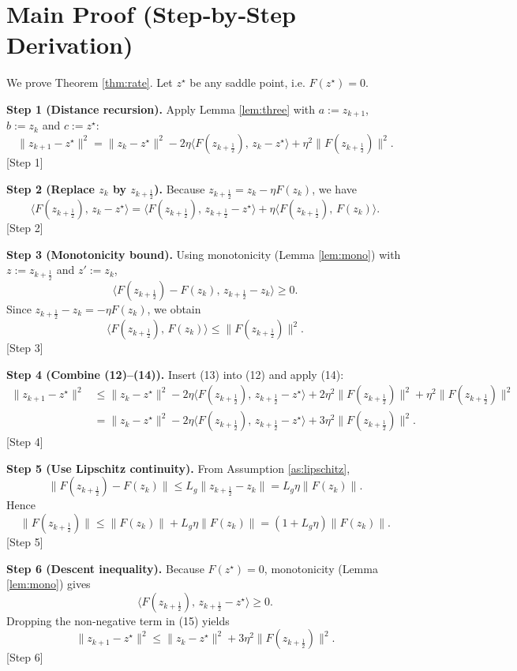 \documentclass{article}
\begin{document}
\section*{Main Proof (Step‑by‑Step Derivation)}
We prove Theorem \ref{thm:rate}. Let $z^{\star}$ be any saddle point, i.e. $F(z^{\star})=0$.

\bigskip
\noindent\textbf{Step 1 (Distance recursion).}  
Apply Lemma \ref{lem:three} with $a:=z_{k+1}$, $b:=z_{k}$ and $c:=z^{\star}$:
\[
\|z_{k+1}-z^{\star}\|^{2}= \|z_{k}-z^{\star}\|^{2}
-2\eta\langle F(z_{k+\frac12}),\,z_{k}-z^{\star}\rangle
+\eta^{2}\|F(z_{k+\frac12})\|^{2}.
\tag{12}
\]
[Step 1]

\noindent\textbf{Step 2 (Replace $z_{k}$ by $z_{k+\frac12}$).}  
Because $z_{k+\frac12}=z_{k}-\eta F(z_{k})$, we have
\[
\langle F(z_{k+\frac12}),\,z_{k}-z^{\star}\rangle
= \langle F(z_{k+\frac12}),\,z_{k+\frac12}-z^{\star}\rangle
+\eta\langle F(z_{k+\frac12}),\,F(z_{k})\rangle .
\tag{13}
\]
[Step 2]

\noindent\textbf{Step 3 (Monotonicity bound).}  
Using monotonicity (Lemma \ref{lem:mono}) with $z:=z_{k+\frac12}$ and $z':=z_{k}$,
\[
\langle F(z_{k+\frac12})-F(z_{k}),\,z_{k+\frac12}-z_{k}\rangle\ge0.
\]
Since $z_{k+\frac12}-z_{k}=-\eta F(z_{k})$, we obtain
\[
\langle F(z_{k+\frac12}),\,F(z_{k})\rangle
\le\|F(z_{k+\frac12})\|^{2}.
\tag{14}
\]
[Step 3]

\noindent\textbf{Step 4 (Combine (12)–(14)).}  
Insert (13) into (12) and apply (14):
\[
\begin{aligned}
\|z_{k+1}-z^{\star}\|^{2}
&\le \|z_{k}-z^{\star}\|^{2}
-2\eta\langle F(z_{k+\frac12}),\,z_{k+\frac12}-z^{\star}\rangle
+2\eta^{2}\|F(z_{k+\frac12})\|^{2}
+\eta^{2}\|F(z_{k+\frac12})\|^{2}\\[1mm]
&= \|z_{k}-z^{\star}\|^{2}
-2\eta\langle F(z_{k+\frac12}),\,z_{k+\frac12}-z^{\star}\rangle
+3\eta^{2}\|F(z_{k+\frac12})\|^{2}.
\end{aligned}
\tag{15}
\]
[Step 4]

\noindent\textbf{Step 5 (Use Lipschitz continuity).}  
From Assumption \ref{as:lipschitz},
\[
\|F(z_{k+\frac12})-F(z_{k})\|\le L_{g}\|z_{k+\frac12}-z_{k}\|
= L_{g}\eta\|F(z_{k})\|.
\]
Hence
\[
\|F(z_{k+\frac12})\|\le\|F(z_{k})\|+L_{g}\eta\|F(z_{k})\|
=(1+L_{g}\eta)\|F(z_{k})\|.
\tag{16}
\]
[Step 5]

\noindent\textbf{Step 6 (Descent inequality).}  
Because $F(z^{\star})=0$, monotonicity (Lemma \ref{lem:mono}) gives
\[
\langle F(z_{k+\frac12}),\,z_{k+\frac12}-z^{\star}\rangle
\ge0.
\tag{17}
\]
Dropping the non‑negative term in (15) yields
\[
\|z_{k+1}-z^{\star}\|^{2}
\le \|z_{k}-z^{\star}\|^{2}+3\eta^{2}\|F(z_{k+\frac12})\|^{2}.
\tag{18}
\]
[Step 6]
\end{document}
